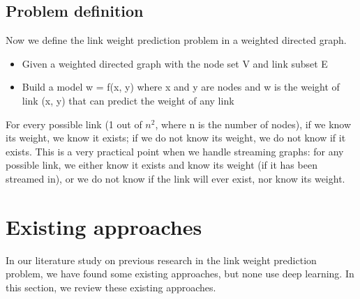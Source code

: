 \documentclass[11pt,twocolumn]{article}
\begin{document}
\subsection{Problem definition}
Now we define the link weight prediction problem in a weighted directed graph.
\begin{itemize}
	\item Given a weighted directed graph with the node set V and link subset E
	\item Build a model w = f(x, y) where x and y are nodes and w is the weight of link (x, y) that can predict the weight of any link
\end{itemize}
For every possible link (1 out of $ n^2 $, where n is the number of nodes), 
if we know its weight, we know it exists;
if we do not know its weight, we do not know if it exists.
This is a very practical point when we handle streaming graphs:
for any possible link,
we either know it exists and know its weight (if it has been streamed in), or we do not know if the link will ever exist, nor know its weight.

\section{Existing approaches}
In our literature study on previous research in the link weight prediction problem,
we have found some existing approaches, but none use deep learning.
In this section,
we review these existing approaches.
\end{document}
